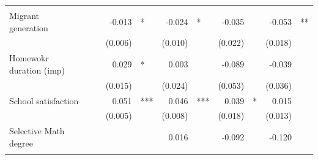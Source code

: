 \documentclass{article}
\begin{document}
\begin{table}[!h]
\begin{tabular}{lllllllllll}
  \multicolumn{1}{l}{} \\
\multicolumn{1}{l}{Migrant generation} &
  \multicolumn{1}{r}{} &
  \multicolumn{1}{l}{} &
  \multicolumn{1}{r}{-0.013} &
  \multicolumn{1}{l}{*} &
  \multicolumn{1}{r}{-0.024} &
  \multicolumn{1}{l}{*} &
  \multicolumn{1}{r}{-0.035} &
  \multicolumn{1}{l}{} &
  \multicolumn{1}{r}{-0.053} &
  \multicolumn{1}{l}{**} \\
\multicolumn{1}{l}{} &
  \multicolumn{1}{r}{} &
  \multicolumn{1}{l}{} &
  \multicolumn{1}{r}{(0.006)} &
  \multicolumn{1}{l}{} &
  \multicolumn{1}{r}{(0.010)} &
  \multicolumn{1}{l}{} &
  \multicolumn{1}{r}{(0.022)} &
  \multicolumn{1}{l}{} &
  \multicolumn{1}{r}{(0.018)} &
  \multicolumn{1}{l}{} \\
\multicolumn{1}{l}{Homewokr duration (imp)} &
  \multicolumn{1}{r}{} &
  \multicolumn{1}{l}{} &
  \multicolumn{1}{r}{0.029} &
  \multicolumn{1}{l}{*} &
  \multicolumn{1}{r}{0.003} &
  \multicolumn{1}{l}{} &
  \multicolumn{1}{r}{-0.089} &
  \multicolumn{1}{l}{} &
  \multicolumn{1}{r}{-0.039} &
  \multicolumn{1}{l}{} \\
\multicolumn{1}{l}{} &
  \multicolumn{1}{r}{} &
  \multicolumn{1}{l}{} &
  \multicolumn{1}{r}{(0.015)} &
  \multicolumn{1}{l}{} &
  \multicolumn{1}{r}{(0.024)} &
  \multicolumn{1}{l}{} &
  \multicolumn{1}{r}{(0.053)} &
  \multicolumn{1}{l}{} &
  \multicolumn{1}{r}{(0.036)} &
  \multicolumn{1}{l}{} \\
\multicolumn{1}{l}{School satisfaction} &
  \multicolumn{1}{r}{} &
  \multicolumn{1}{l}{} &
  \multicolumn{1}{r}{0.051} &
  \multicolumn{1}{l}{***} &
  \multicolumn{1}{r}{0.046} &
  \multicolumn{1}{l}{***} &
  \multicolumn{1}{r}{0.039} &
  \multicolumn{1}{l}{*} &
  \multicolumn{1}{r}{0.015} &
  \multicolumn{1}{l}{} \\
\multicolumn{1}{l}{} &
  \multicolumn{1}{r}{} &
  \multicolumn{1}{l}{} &
  \multicolumn{1}{r}{(0.005)} &
  \multicolumn{1}{l}{} &
  \multicolumn{1}{r}{(0.008)} &
  \multicolumn{1}{l}{} &
  \multicolumn{1}{r}{(0.018)} &
  \multicolumn{1}{l}{} &
  \multicolumn{1}{r}{(0.013)} &
  \multicolumn{1}{l}{} \\
\multicolumn{1}{l}{Selective Math degree} &
  \multicolumn{1}{r}{} &
  \multicolumn{1}{l}{} &
  \multicolumn{1}{r}{} &
  \multicolumn{1}{l}{} &
  \multicolumn{1}{r}{0.016} &
  \multicolumn{1}{l}{} &
  \multicolumn{1}{r}{-0.092} &
  \multicolumn{1}{l}{} &
  \multicolumn{1}{r}{-0.120} &
  \multicolumn{1}{l}{} \\
\multicolumn{1}{l}{} &
  \multicolumn{1}{r}{} &
  \multicolumn{1}{l}{} &
  \multicolumn{1}{r}{} &

\end{tabular}
\end{table}
\end{document}
